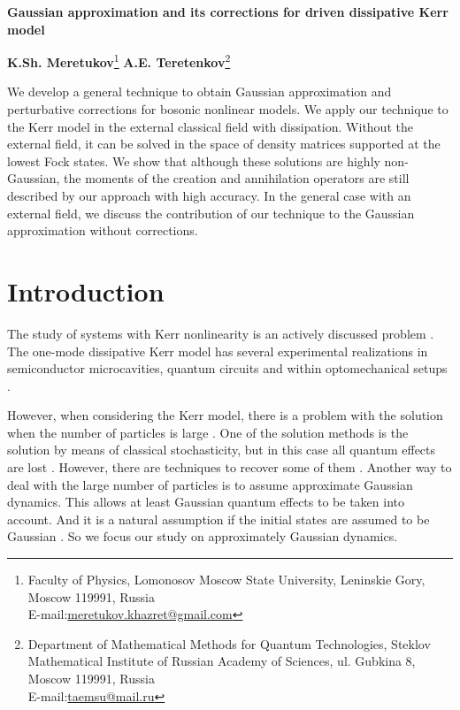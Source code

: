 \documentclass[12pt]{article}
\theoremstyle{definition}
\begin{document}
	\begin{center}
		\Large
		\textbf{Gaussian approximation and its corrections for driven dissipative Kerr model}
		
		\large 
		\textbf{K.Sh. Meretukov}\footnote{Faculty of Physics, Lomonosov Moscow State University, Leninskie Gory, Moscow 119991, Russia\\
			E-mail:\href{mailto:meretukov.khazret@gmail.com}{meretukov.khazret@gmail.com}}
		\textbf{A.E. Teretenkov}\footnote{Department of Mathematical Methods for Quantum Technologies, Steklov Mathematical Institute of Russian Academy of Sciences, ul. Gubkina 8, Moscow 119991, Russia\\ E-mail:\href{mailto:taemsu@mail.ru}{taemsu@mail.ru}}
		\\[1mm]
	\end{center}
	
	\footnotesize
	We develop a general technique to obtain Gaussian approximation and perturbative corrections for bosonic nonlinear models. We apply our technique to the Kerr model in the external classical field with dissipation. Without the external field, it can be solved in the space of density matrices supported at the lowest Fock states. We show that although these solutions are highly non-Gaussian, the moments of the creation and annihilation operators are still described by our approach with high accuracy. In the general case with an external field, we discuss the contribution of our technique to the Gaussian approximation without corrections.
	\normalsize
	
	\section{\label{sec:introduction}Introduction}
	
	The study of systems with Kerr nonlinearity is an actively discussed problem \cite{KerrIntr}. The one-mode dissipative Kerr model has several experimental realizations in semiconductor microcavities, quantum circuits and within optomechanical setups \cite{asjad2023joint}. 
 
 However, when considering the Kerr model, there is a problem with the solution when the number of particles is large \cite{MaslovN}. One of the solution methods is the solution by means of classical stochasticity, but in this case all quantum effects are lost \cite{MaslovSolve}. However, there are techniques to recover some of them  \cite{corney2015non}. Another way to deal with the large number of particles is to assume approximate Gaussian dynamics. This allows at least Gaussian quantum effects to be taken into account. And it is a natural assumption if the initial states are assumed to be Gaussian \cite{joneckis1993quantum, banerjee1993interaction, genoni2009enhancement, roman2015parametric,  bolandhemmat2023quantum}. So we focus our study on approximately Gaussian dynamics.
 
\end{document}

